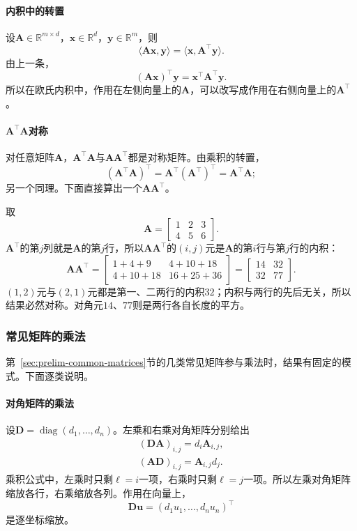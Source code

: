 \paragraph{内积中的转置}
设$\bm A\in\mathbb R^{m\times d}$，$\bm x\in\mathbb R^d$，$\bm y\in\mathbb R^m$，则
\begin{equation}
\langle\bm A\bm x,\bm y\rangle=\langle\bm x,\bm A^\top\bm y\rangle.
 \label{eq:ls-transpose-inner-product}
\end{equation}
由上一条，
\[
 (\bm A\bm x)^\top\bm y=\bm x^\top\bm A^\top\bm y.
\]
所以在欧氏内积中，作用在左侧向量上的$\bm A$，可以改写成作用在右侧向量上的$\bm A^\top$。

\paragraph{$\bm A^\top\bm A$对称}
对任意矩阵$\bm A$，$\bm A^\top\bm A$与$\bm A\bm A^\top$都是对称矩阵。由乘积的转置，
\[
 (\bm A^\top\bm A)^\top=\bm A^\top(\bm A^\top)^\top=\bm A^\top\bm A;
\]
另一个同理。下面直接算出一个$\bm A\bm A^\top$。
\begin{example}[计算$\bm A\bm A^\top$]
\label{ex:ls-gram-product-symmetric}
取
\[
 \bm A=\begin{bmatrix}1&2&3\\4&5&6\end{bmatrix}.
\]
$\bm A^\top$的第$j$列就是$\bm A$的第$j$行，所以$\bm A\bm A^\top$的$(i,j)$元是$\bm A$的第$i$行与第$j$行的内积：
\[
 \bm A\bm A^\top=\begin{bmatrix}1+4+9&4+10+18\\4+10+18&16+25+36\end{bmatrix}=\begin{bmatrix}14&32\\32&77\end{bmatrix}.
\]
$(1,2)$元与$(2,1)$元都是第一、二两行的内积$32$；内积与两行的先后无关，所以结果必然对称。对角元$14$、$77$则是两行各自长度的平方。
\end{example}

\subsubsection{常见矩阵的乘法}
\label{sec:ls-common-matrix-products}

第~\ref{sec:prelim-common-matrices}节的几类常见矩阵参与乘法时，结果有固定的模式。下面逐类说明。

\paragraph{对角矩阵的乘法}
设$\bm D=\operatorname{diag}(d_1,\ldots,d_n)$。左乘和右乘对角矩阵分别给出
\[
 \begin{gathered}
(\bm D\bm A)_{i,j}=d_i\bm A_{i,j},\\
(\bm A\bm D)_{i,j}=\bm A_{i,j}d_j.
 \end{gathered}
\]
乘积公式中，左乘时只剩$\ell=i$一项，右乘时只剩$\ell=j$一项。所以左乘对角矩阵缩放各行，右乘缩放各列。作用在向量上，
\[
 \bm D\bm u=(d_1u_1,\ldots,d_nu_n)^\top
\]
是逐坐标缩放。

